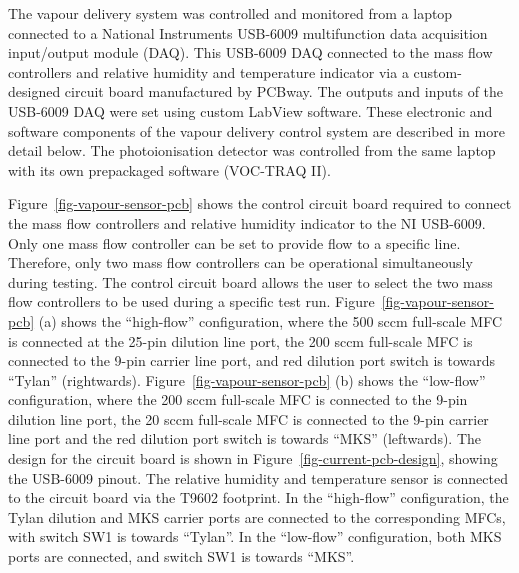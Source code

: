 \documentclass[
  a4paper,
]{scrbook}
\begin{document}
The vapour delivery system was controlled and monitored from a laptop
connected to a National Instruments USB-6009 multifunction data
acquisition input/output module (DAQ). This USB-6009 DAQ connected to
the mass flow controllers and relative humidity and temperature
indicator via a custom-designed circuit board manufactured by PCBway.
The outputs and inputs of the USB-6009 DAQ were set using custom LabView
software. These electronic and software components of the vapour
delivery control system are described in more detail below. The
photoionisation detector was controlled from the same laptop with its
own prepackaged software (VOC-TRAQ II).

Figure~\ref{fig-vapour-sensor-pcb} shows the control circuit board
required to connect the mass flow controllers and relative humidity
indicator to the NI USB-6009. Only one mass flow controller can be set
to provide flow to a specific line. Therefore, only two mass flow
controllers can be operational simultaneously during testing. The
control circuit board allows the user to select the two mass flow
controllers to be used during a specific test run.
Figure~\ref{fig-vapour-sensor-pcb} (a) shows the ``high-flow''
configuration, where the 500 sccm full-scale MFC is connected at the
25-pin dilution line port, the 200 sccm full-scale MFC is connected to
the 9-pin carrier line port, and red dilution port switch is towards
``Tylan'' (rightwards). Figure~\ref{fig-vapour-sensor-pcb} (b) shows the
``low-flow'' configuration, where the 200 sccm full-scale MFC is
connected to the 9-pin dilution line port, the 20 sccm full-scale MFC is
connected to the 9-pin carrier line port and the red dilution port
switch is towards ``MKS'' (leftwards). The design for the circuit board
is shown in Figure~\ref{fig-current-pcb-design}, showing the USB-6009
pinout. The relative humidity and temperature sensor is connected to the
circuit board via the T9602 footprint. In the ``high-flow''
configuration, the Tylan dilution and MKS carrier ports are connected to
the corresponding MFCs, with switch SW1 is towards ``Tylan''. In the
``low-flow'' configuration, both MKS ports are connected, and switch SW1
is towards ``MKS''.
\end{document}
